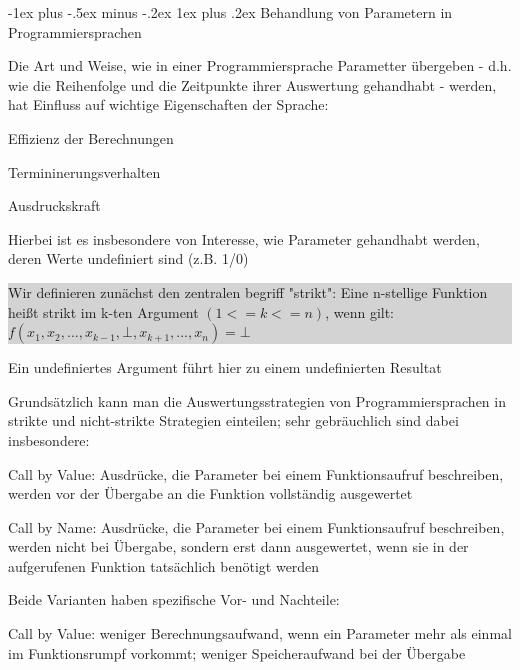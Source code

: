 \documentclass[10pt]{article}
\makeatletter
\renewcommand{\subsubsection}{\@startsection{subsubsection}{3}{0mm}%
                                {-1ex plus -.5ex minus -.2ex}%
                                {1ex plus .2ex}%
                                {\normalfont\small\bfseries}}
\makeatother
\begin{document}
\subsubsection{Behandlung von Parametern in Programmiersprachen}
\begin{itemize*}
  \item Die Art und Weise, wie in einer Programmiersprache Parametter übergeben - d.h. wie die Reihenfolge und die Zeitpunkte ihrer Auswertung gehandhabt - werden, hat Einfluss auf wichtige Eigenschaften der Sprache:
  \begin{itemize*}
    \item Effizienz der Berechnungen
    \item Termininerungsverhalten
    \item Ausdruckskraft
  \end{itemize*}
  \item Hierbei ist es insbesondere von Interesse, wie Parameter gehandhabt werden, deren Werte undefiniert sind (z.B. 1/0)\newline
  \colorbox{lightgray}{
    \begin{minipage}[h]{1.0\linewidth}
      Wir definieren zunächst den zentralen begriff "strikt": \newline Eine n-stellige Funktion heißt strikt im k-ten Argument $(1<=k<=n)$, wenn gilt: $f(x_1,x_2,...,x_{k-1},\bot,x_{k+1},...,x_n)=\bot$
    \end{minipage}}
  \item Ein undefiniertes Argument führt hier zu einem undefinierten Resultat
  \item Grundsätzlich kann man die Auswertungsstrategien von Programmiersprachen in strikte und nicht-strikte Strategien einteilen; sehr gebräuchlich sind dabei insbesondere:
  \begin{itemize*}
    \item Call by Value: Ausdrücke, die Parameter bei einem Funktionsaufruf beschreiben, werden vor der Übergabe an die Funktion vollständig ausgewertet
    \item Call by Name: Ausdrücke, die Parameter bei einem Funktionsaufruf beschreiben, werden nicht bei Übergabe, sondern erst dann ausgewertet, wenn sie in der aufgerufenen Funktion tatsächlich benötigt werden
  \end{itemize*}
  \item Beide Varianten haben spezifische Vor- und Nachteile:
  \begin{itemize*}
    \item Call by Value: weniger Berechnungsaufwand, wenn ein Parameter mehr als einmal im Funktionsrumpf vorkommt; weniger Speicheraufwand bei der Übergabe

\end{itemize*}
\end{itemize*}
\end{document}

